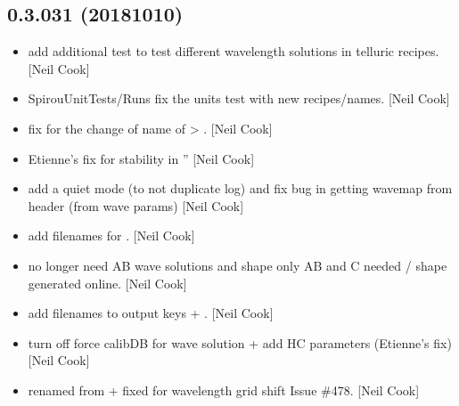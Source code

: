 \documentclass[a4paper,10pt,english]{report}
\begin{document}
\subsection{0.3.031 (2018\sphinxhyphen{}10\sphinxhyphen{}10)}
\label{\detokenize{misc/changelog:id319}}\begin{itemize}
\item {} 
 \sphinxhyphen{} add additional test to test different wavelength
solutions in telluric recipes. {[}Neil Cook{]}

\item {} 
SpirouUnitTests/Runs \sphinxhyphen{} fix the units test with new recipes/names.
{[}Neil Cook{]}

\item {} 
 \sphinxhyphen{} fix for the change of name of
 \textendash{}\textgreater{} . {[}Neil Cook{]}

\item {} 
 \sphinxhyphen{} Etienne’s fix for  stability in
” {[}Neil Cook{]}

\item {} 
 \sphinxhyphen{} add a quiet mode (to not duplicate log) and fix bug in
getting wavemap from header (from wave params) {[}Neil Cook{]}

\item {} 
 \sphinxhyphen{} add filenames for . {[}Neil Cook{]}

\item {} 
 \sphinxhyphen{} no longer need AB wave solutions and shape
\sphinxhyphen{} only AB and C needed / shape generated online. {[}Neil Cook{]}

\item {} 
 \sphinxhyphen{} add  filenames to output keys +
. {[}Neil Cook{]}

\item {} 
 \sphinxhyphen{} turn off force calibDB for wave solution +
add HC parameters (Etienne’s fix) {[}Neil Cook{]}

\item {} 
 \sphinxhyphen{} renamed from  + fixed for
wavelength grid shift \sphinxhyphen{} Issue \#478. {[}Neil Cook{]}


\end{itemize}
\end{document}
